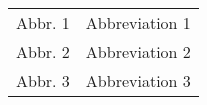 
\begin{tabular}{p{7em}p{25em}}
	Abbr. 1 & Abbreviation 1 \\
	Abbr. 2 & Abbreviation 2 \\
	Abbr. 3 & Abbreviation 3 \\
\end{tabular}
